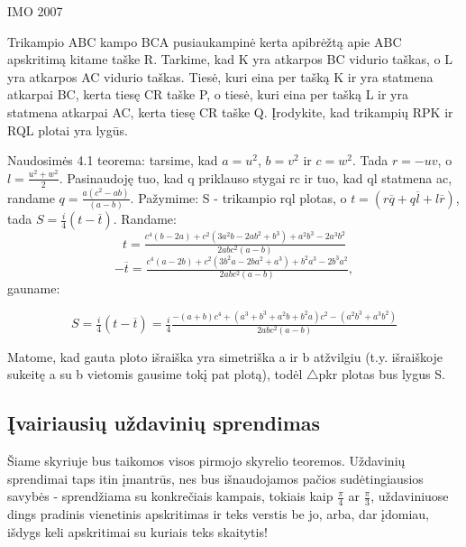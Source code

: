 \begin{pavnr}

 IMO 2007

Trikampio ABC kampo BCA pusiaukampinė kerta apibrėžtą apie ABC apskritimą kitame taške R. Tarkime, kad K yra atkarpos BC vidurio taškas, o L yra atkarpos AC vidurio taškas. Tiesė, kuri eina per tašką K ir yra statmena atkarpai BC, kerta tiesę CR taške P, o tiesė, kuri eina per tašką L ir yra statmena atkarpai AC, kerta tiesę CR taške Q. Įrodykite, kad trikampių RPK ir RQL plotai yra lygūs.

\end{pavnr}
\begin{sprendimas}


Naudosimės 4.1 teorema: tarsime, kad $a=u^2$, $b=v^2$ ir $c=w^2$. Tada $r=-uv$, o $l=\tfrac{u^2+w^2}{2}$. Pasinaudoję tuo, kad q priklauso stygai rc ir tuo, kad ql statmena ac, randame $q=\tfrac{a(c^2 - ab)}{(a-b)}$. Pažymime: S - trikampio rql plotas, o $t=(r\overline{q} +q\overline{l}+l\overline{r})$, tada $S=\tfrac{i}{4}(t-\overline{t})$. Randame:
\begin{equation*}
t=\tfrac{c^4(b-2a) +c^2(3a^2b-2ab^2+b^3) +a^2b^3 - 2a^3b^2}{2abc^2(a-b)}
\end{equation*}
\begin{equation*}
-\overline{t}=\tfrac{c^4(a-2b) +c^2(3b^2a-2ba^2+a^3) +b^2a^3 - 2b^3a^2}{2abc^2(a-b)},
\end{equation*}gauname:

\begin{equation*}
S=\tfrac{i}{4}(t-\overline{t})=\tfrac{i}{4}\tfrac{-(a+b)c^4+(a^3+b^3+a^2b+b^2a)c^2-(a^2b^3+a^3b^2)}{2abc^2(a-b)}
\end{equation*}

Matome, kad gauta ploto išraiška yra simetriška a ir b atžvilgiu (t.y. išraiškoje sukeitę a su b vietomis gausime tokį pat plotą), todėl $\triangle$pkr plotas bus lygus S.
\end{sprendimas}

\subsection{Įvairiausių uždavinių sprendimas}

Šiame skyriuje bus taikomos visos pirmojo skyrelio teoremos. Uždavinių sprendimai taps
itin įmantrūs, nes bus išnaudojamos pačios sudėtingiausios savybės - sprendžiama
su konkrečiais kampais, tokiais kaip $\frac \pi 4$ ar $\frac \pi 3$, uždaviniuose
dings pradinis vienetinis apskritimas ir teks verstis be jo, arba, dar įdomiau, 
išdygs keli apskritimai su kuriais teks skaitytis!

